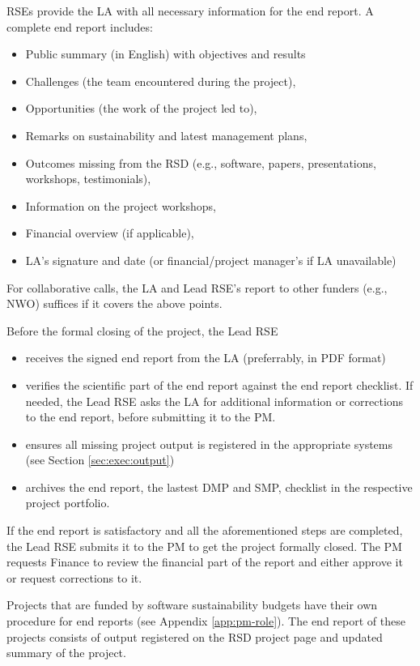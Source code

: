 RSEs provide the LA with all necessary information for the end report.%
A complete end report includes:
\begin{itemize}
\item Public summary (in English) with objectives and results
\item Challenges (the team encountered during the project),
\item Opportunities (the work of the project led to),
\item Remarks on sustainability and latest management plans,
\item Outcomes missing from the RSD (e.g., software, papers, presentations, workshops, testimonials),
\item Information on the project workshops,
\item Financial overview (if applicable),
\item LA's signature and date (or financial/project manager's if LA unavailable)
\end{itemize}
For collaborative calls, the LA and Lead RSE's report to other funders (e.g., NWO) suffices if it covers the above points.

Before the formal closing of the project, the Lead RSE 
\begin{itemize}
   \item receives the signed end report from the LA (preferrably, in PDF format)
   \item verifies the scientific part of the end report against the end report checklist. If needed, the Lead RSE asks the LA for additional information or corrections to the end report, before submitting it to the PM. 
   \item ensures all missing project output is registered in the appropriate systems (see Section \ref{sec:exec:output}) 
   \item archives the end report, the lastest DMP and SMP, checklist in the respective project portfolio.
\end{itemize}
If the end report is satisfactory and all the aforementioned steps are completed, the Lead RSE submits it to the PM to get the project formally closed. The PM requests Finance to review the financial 
part of the report and either approve it or request corrections to it. 

Projects that are funded by software sustainability budgets have their own procedure for end reports (see Appendix
\ref{app:pm-role}). The end report of these projects consists of output registered on the RSD project page and
updated summary of the project.

